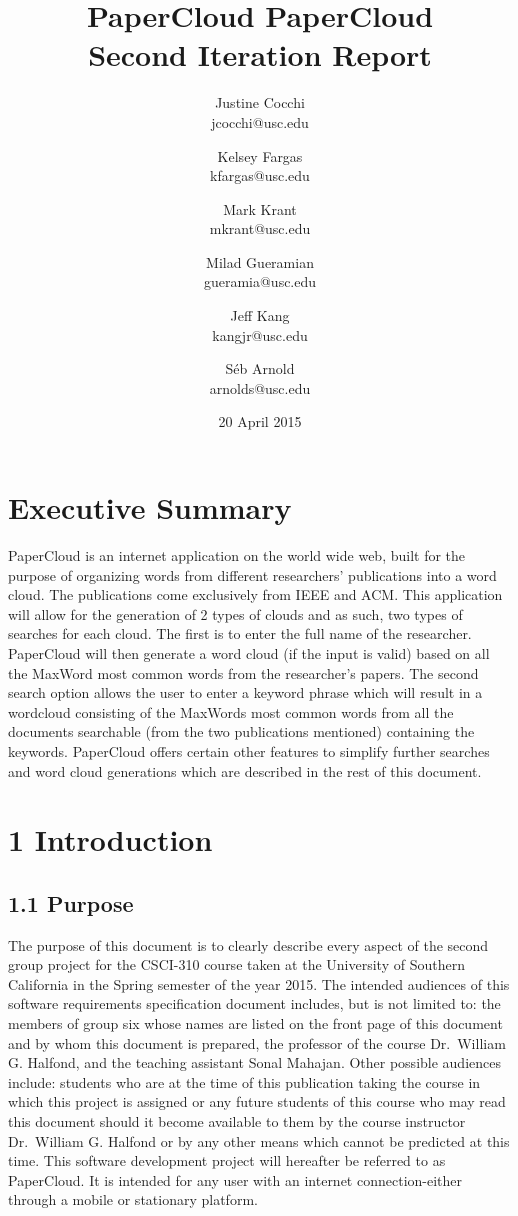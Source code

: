 \documentclass[]{article}
\title{PaperCloud}
\author{Justine Cocchi\\jcocchi@usc.edu \and Kelsey Fargas\\kfargas@usc.edu \and Mark Krant \\ mkrant@usc.edu\and Milad Gueramian\\gueramia@usc.edu \and Jeff Kang\\kangjr@usc.edu \and Séb Arnold\\arnolds@usc.edu}
\date{20 April 2015}
\title{%
	PaperCloud \\
	\large Second Iteration Report}
\begin{document}
\clearpage\maketitle
\thispagestyle{empty}

\pagebreak

\tableofcontents
\setcounter{tocdepth}{4}
\thispagestyle{empty}

\pagebreak

\section{Executive Summary}\label{executive-summary}

PaperCloud is an internet application on the world wide web, built for
the purpose of organizing words from different researchers' publications
into a word cloud. The publications come exclusively from IEEE and ACM.
This application will allow for the generation of 2 types of clouds and
as such, two types of searches for each cloud. The first is to enter the
full name of the researcher. PaperCloud will then generate a word cloud
(if the input is valid) based on all the MaxWord most common words from
the researcher's papers. The second search option allows the user to
enter a keyword phrase which will result in a wordcloud consisting of
the MaxWords most common words from all the documents searchable (from
the two publications mentioned) containing the keywords. PaperCloud
offers certain other features to simplify further searches and word
cloud generations which are described in the rest of this document.

\section{1 Introduction}\label{introduction}

\subsection{1.1 Purpose}\label{purpose}

The purpose of this document is to clearly describe every aspect of the
second group project for the CSCI-310 course taken at the University of
Southern California in the Spring semester of the year 2015. The
intended audiences of this software requirements specification document
includes, but is not limited to: the members of group six whose names
are listed on the front page of this document and by whom this document
is prepared, the professor of the course Dr.~William G. Halfond, and the
teaching assistant Sonal Mahajan. Other possible audiences include:
students who are at the time of this publication taking the course in
which this project is assigned or any future students of this course who
may read this document should it become available to them by the course
instructor Dr.~William G. Halfond or by any other means which cannot be
predicted at this time. This software development project will hereafter
be referred to as PaperCloud. It is intended for any user with an
internet connection-either through a mobile or stationary platform.
\end{document}
